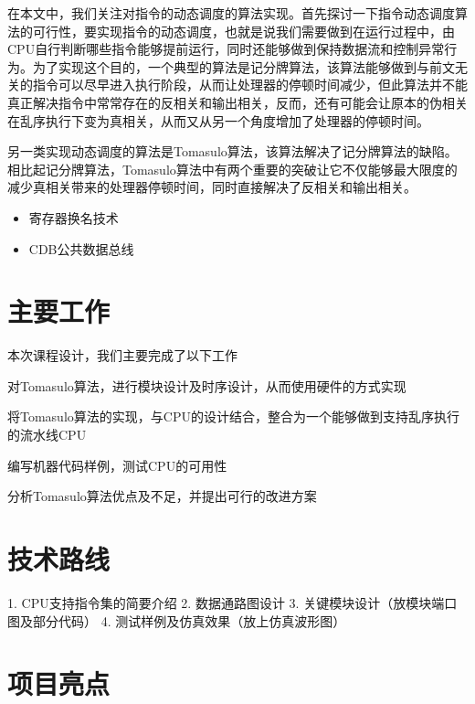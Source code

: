 \documentclass[twoside]{article}
\begin{document}
在本文中，我们关注对指令的动态调度的算法实现。首先探讨一下指令动态调度算法的可行性，要实现指令的动态调度，也就是说我们需要做到在运行过程中，由CPU自行判断哪些指令能够提前运行，同时还能够做到保持数据流和控制异常行为。为了实现这个目的，一个典型的算法是记分牌算法，该算法能够做到与前文无关的指令可以尽早进入执行阶段，从而让处理器的停顿时间减少，但此算法并不能真正解决指令中常常存在的反相关和输出相关，反而，还有可能会让原本的伪相关在乱序执行下变为真相关，从而又从另一个角度增加了处理器的停顿时间。

另一类实现动态调度的算法是Tomasulo算法，该算法解决了记分牌算法的缺陷。相比起记分牌算法，Tomasulo算法中有两个重要的突破\cite{wiki:tomasulo}让它不仅能够最大限度的减少真相关带来的处理器停顿时间，同时直接解决了反相关和输出相关。
\begin{itemize}
	\item 寄存器换名技术
	\item CDB公共数据总线
\end{itemize}


\section{主要工作}
本次课程设计，我们主要完成了以下工作
\begin{compactitem}
	\item 对Tomasulo算法，进行模块设计及时序设计，从而使用硬件的方式实现
	\item 将Tomasulo算法的实现，与CPU的设计结合，整合为一个能够做到支持乱序执行的流水线CPU
	\item 编写机器代码样例，测试CPU的可用性
	\item 分析Tomasulo算法优点及不足，并提出可行的改进方案
\end{compactitem}

\section{技术路线}

1. CPU支持指令集的简要介绍
2. 数据通路图设计
3. 关键模块设计（放模块端口图及部分代码）
4. 测试样例及仿真效果（放上仿真波形图）


\section{项目亮点}
\end{document}
